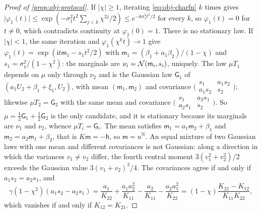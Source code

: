 \begin{proof}[Proof of \cref{prop:obj-protocol}]
If $\lvert\chi\rvert\ge1$, iterating \eqref{eq:obj-charfn} $k$ times gives $\lvert\varphi_1(t)\rvert\le\exp(-\sigma_1^2t^2\sum_{j<k}\chi^{2j}/2)\le e^{-k\sigma_1^2t^2/2}$ for every $k$, so $\varphi_1(t)=0$ for $t\neq0$, which contradicts continuity at $\varphi_1(0)=1$. There is no stationary law. If $\lvert\chi\rvert<1$, the same iteration and $\varphi_1(\chi^kt)\to1$ give $\varphi_1(t)=\exp(\mathrm it\mathsf m_1-s_1t^2/2)$ with $\mathsf m_1=(\beta_1+a_1\beta_2)/(1-\chi)$ and $s_1=\sigma_1^2/(1-\chi^2)$: the marginals are $\nu_i=\mathcal{N}(\mathsf m_i,s_i)$, uniquely. The law $\mu T_1$ depends on $\mu$ only through $\nu_2$ and is the Gaussian law $\mathsf G_1$ of $(a_1U_2+\beta_1+\xi_1,U_2)$, with mean $(\mathsf m_1,\mathsf m_2)$ and covariance $\bigl(\begin{smallmatrix}s_1&a_1s_2\\a_1s_2&s_2\end{smallmatrix}\bigr)$; likewise $\mu T_2=\mathsf G_2$ with the same mean and covariance $\bigl(\begin{smallmatrix}s_1&a_2s_1\\a_2s_1&s_2\end{smallmatrix}\bigr)$. So $\mu=\frac12\mathsf G_1+\frac12\mathsf G_2$ is the only candidate, and it is stationary because its marginals are $\nu_1$ and $\nu_2$, whence $\mu T_i=\mathsf G_i$. The mean satisfies $\mathsf m_1=a_1\mathsf m_2+\beta_1$ and $\mathsf m_2=a_2\mathsf m_1+\beta_2$, that is $K\mathsf m=-\mathsf h$, so $\mathsf m=u^{\mathrm N}$. An equal mixture of two Gaussian laws with one mean and different covariances is not Gaussian: along a direction in which the variances $v_1\neq v_2$ differ, the fourth central moment $3(v_1^2+v_2^2)/2$ exceeds the Gaussian value $3(v_1+v_2)^2/4$. The covariances agree if and only if $a_1s_2=a_2s_1$, and
\begin{equation*}
\gamma(1-\chi^2)(a_1s_2-a_2s_1)=\frac{a_1}{K_{22}}+\frac{a_1a_2^2}{K_{11}}-\frac{a_2}{K_{11}}-\frac{a_2a_1^2}{K_{22}}=(1-\chi)\frac{K_{21}-K_{12}}{K_{11}K_{22}},
\end{equation*}
which vanishes if and only if $K_{12}=K_{21}$.


\end{proof}
